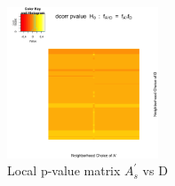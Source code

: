 \documentclass[12pt]{report}
\begin{document}
 
\begin{figure}[H]
\captionsetup{format=plain}
\centering
\includegraphics[width=0.4\textwidth]{../figure/P_A2_D.png}
\caption{Local p-value matrix $A^\prime_{s}$ vs D}
\label{fig:PAD}
\end{figure} 

 
 
 
\end{document}
